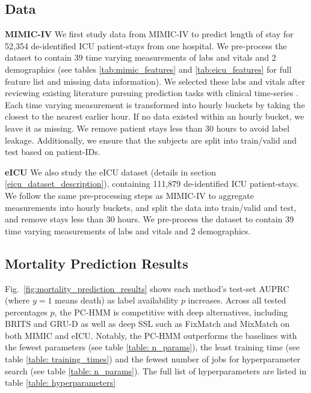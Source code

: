 \subsection{Data}
\textbf{MIMIC-IV} We first study data from MIMIC-IV \cite{johnson2020mimic} to predict length of stay for 52,354 de-identified ICU  patient-stays from one hospital. We pre-process the dataset to contain 39 time varying measurements of labs and vitals and 2 demographics (see tables \ref{tab:mimic_features} and \ref{tab:eicu_features} for full feature list and missing data information). We selected these labs and vitals after reviewing existing literature pursuing prediction tasks with clinical time-series \citep{harutyunyanMultitaskLearningBenchmarking2019a, purushothamBenchmarkingDeepLearning2018}. Each time varying measurement is transformed into hourly buckets by taking the closest to the nearest earlier hour. If no data existed within an hourly bucket, we leave it as missing. We remove patient stays less than 30 hours to avoid label leakage. Additionally, we ensure that the subjects are split into train/valid and test based on patient-IDs.



\textbf{eICU} We also study the eICU dataset \cite{eICU} (details in section \ref{eicu_dataset_description}), containing 111,879 de-identified ICU patient-stays. We follow the same pre-processing steps as MIMIC-IV to aggregate measurements into hourly buckets, and split the data into train/valid and test, and remove stays less than 30 hours. We pre-process the dataset to contain 39 time varying measurements of labs and vitals and 2 demographics. 
\label{eicu_dataset_description}




\subsection{Mortality Prediction Results}
Fig.~\ref{fig:mortality_prediction_results} shows each method's test-set AUPRC (where $y=1$ means death) as label availability $p$ increases.
Across all tested percentages $p$, the PC-HMM is competitive with deep alternatives, including BRITS and GRU-D as well as deep SSL such as FixMatch and MixMatch on both MIMIC and eICU. Notably, the PC-HMM outperforms the baselines with the fewest parameters (see table \ref{table: n_params}), the least training time (see table \ref{table: training_times}) and the fewest number of jobs for hyperparameter search (see table \ref{table: n_params}). The full list of hyperparameters are listed in table \ref{table: hyperparameters}


